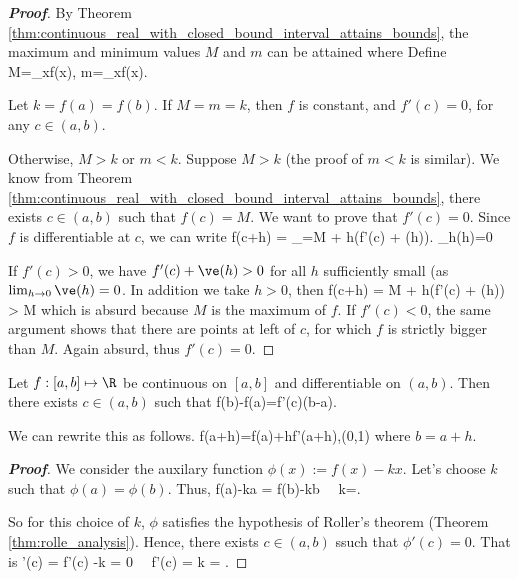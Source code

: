 \begin{proof}[{\bf Proof}]
By Theorem \ref{thm:continuous_real_with_closed_bound_interval_attains_bounds}, the maximum and minimum values $M$ and $m$ can be attained where
Define
\be
M=\max_{x\in[a,b]}f(x), \quad m=\min_{x\in[a,b]}f(x).
\ee

Let $k=f(a)=f(b)$. If $M=m=k$, then $f$ is constant, and $f'(c)=0$, for any $c\in(a,b)$.

Otherwise, $M>k$ or $m<k$. Suppose $M>k$ (the proof of $m<k$ is similar). We know from Theorem \ref{thm:continuous_real_with_closed_bound_interval_attains_bounds}, there exists $c\in(a,b)$ such that $f(c)=M$. We want to prove that $f'(c)=0$. Since $f$ is differentiable at $c$, we can write
\be
f(c+h) = _{=M} + h(f'(c) + \ve(h)). \quad \lob \lim_{h}\ve(h)=0\rob
\ee

If $f'(c)>0$, we have $f'(c) + \ve(h)>0$ for all $h$ sufficiently small (as $\lim_{h\to 0}\ve(h)=0$. In addition we take $h>0$, then
\be
f(c+h) = M + h(f'(c) + \ve(h)) > M
\ee
which is absurd because $M$ is the maximum of $f$. If $f'(c)<0$, the same argument shows that there are points at left of $c$, for which $f$ is strictly bigger than $M$. Again absurd, thus $f'(c)=0$.
\end{proof}

\begin{theorem}\label{thm:mean_value}
Let $f: [a,b]\mapsto \R$ be continuous on $[a,b]$ and differentiable on $(a,b)$. Then there exists $c \in (a,b)$ such that
\be
f(b)-f(a)=f'(c)(b-a).
\ee
\end{theorem}

\begin{remark}
We can rewrite this as follows.
\be
f(a+h)=f(a)+hf'(a+\theta h),\qquad \theta\in(0,1)
\ee
where $b = a+h$.
\end{remark}

\begin{proof}[{\bf Proof}]
We consider the auxilary function $\phi(x):=f(x)-kx$. Let's choose $k$ such that $\phi(a)=\phi(b)$. Thus,
\be
f(a)-ka = f(b)-kb \ \ra \ k=.
\ee

So for this choice of $k$, $\phi$ satisfies the hypothesis of Roller's theorem (Theorem \ref{thm:rolle_analysis}). Hence, there exists $c\in (a,b)$ ssuch that $\phi'(c)=0$. That is
\be
\phi'(c) = f'(c) -k = 0 \ \ra \ f'(c) = k = .
\ee
\end{proof}

